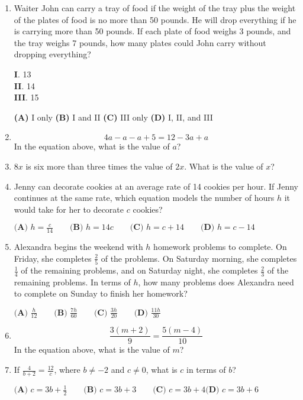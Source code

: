 \documentclass[../satmath.tex]{subfiles}
\begin{document}
\begin{enumerate}[label=\bfseries\arabic*.]
\item 
Waiter John can carry a tray of food if the weight of the tray plus the weight of the plates of food is no more than 50 pounds. He 
will drop everything if he is carrying more than 50 pounds. If each plate of food weighs 3 pounds, and the tray weighs 7 pounds, how many 
plates could John carry without dropping everything?

\textbf{I}. 13\\
\textbf{II}. 14\\
\textbf{III}. 15

\textbf{(A) } I only \qquad \textbf{(B) } I and II \qquad \textbf{(C) } III only \qquad \textbf{(D) } I, II, and III 

\item 
\[4a-a-a+5=12-3a+a\]
In the equation above, what is the value of $a$?

\item 
$8x$ is six more than three times the value of $2x$. What is the value of $x$?

\item
Jenny can decorate cookies at an average rate of 14 cookies per hour. If Jenny continues at the same rate, which equation models the number 
of hours $h$ it would take for her to decorate $c$ cookies?

$\textbf{(A) } h=\frac{c}{14} \qquad \textbf{(B) } h=14c \qquad \textbf{(C) } h=c+14 \qquad \textbf{(D) } h=c-14$

\item 
Alexandra begins the weekend with $h$ homework problems to complete. On Friday, she completes $\frac{2}{5}$ of the problems. On Saturday morning,
she completes $\frac{1}{4}$ of the remaining problems, and on Saturday night, she completes $\frac{2}{3}$ of the remaining problems. In terms of $h$, 
how many problems does Alexandra need to complete on Sunday to finish her homework?

$\textbf{(A) } \frac{h}{12} \qquad \textbf{(B) } \frac{7h}{60} \qquad \textbf{(C) } \frac{3h}{20} \qquad \textbf{(D) } \frac{11h}{30}$

\item
\[\frac{3(m+2)}{9}=\frac{5(m-4)}{10}\]
In the equation above, what is the value of $m$?

\item 
If $\frac{4}{b+2}=\frac{12}{c}$, where $b\neq -2$ and $c\neq 0$, what is $c$ in terms of $b$?

$\textbf{(A) } c=3b+\frac{1}{2} \qquad \textbf{(B) } c=3b+3 \qquad \textbf{(C) } c=3b+4 \textbf{(D) } c=3b+6$


\end{enumerate}
\end{document}
